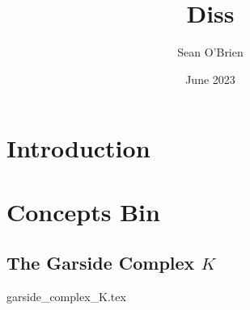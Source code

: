 \documentclass{article}
\title{Diss}
\author{Sean O'Brien}
\date{June 2023}
\begin{document}
\maketitle

\section{Introduction}

\section{Concepts Bin}
\subsection{The Garside Complex $K$}
{garside_complex_K.tex}
\end{document}
